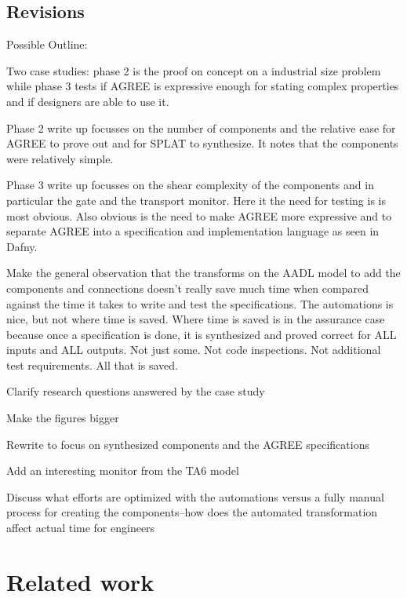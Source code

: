 \documentclass[global,twocolumn,keeplastbox]{svjour}
\begin{document}
\subsection{Revisions}
\begin{compactitem}
  \item Possible Outline:
  \begin{compactitem}
    \item Two case studies: phase 2 is the proof on concept on a industrial size problem while phase 3 tests if AGREE is expressive enough for stating complex properties and if designers are able to use it.
    \item Phase 2 write up focusses on the number of components and the relative ease for AGREE to prove out and for SPLAT to synthesize. It notes that the components were relatively simple.
    \item Phase 3 write up focusses on the shear complexity of the components and in particular the gate and the transport monitor. Here it the need for testing is is most obvious. Also obvious is the need to make AGREE more expressive and to separate AGREE into a specification and implementation language as seen in Dafny.
    \item Make the general observation that the transforms on the AADL model to add the components and connections doesn't really save much time when compared against the time it takes to write and test the specifications. The automations is nice, but not where time is saved. Where time is saved is in the assurance case because once a specification is done, it is synthesized and proved correct for ALL inputs and ALL outputs. Not just some. Not code inspections. Not additional test requirements. All that is saved.
  \end{compactitem}
  \item Clarify research questions answered by the case study
  \item Make the figures bigger
  \item Rewrite to focus on synthesized components and the AGREE specifications
  \item Add an interesting monitor from the TA6 model
  \item Discuss what efforts are optimized with the automations versus a fully manual process for creating the components--how does the automated transformation affect actual time for engineers
\end{compactitem}
\fi

\section{Related work}
\label{sec:related-work}

\end{document}
